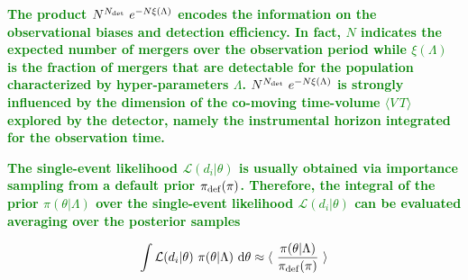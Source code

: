\documentclass[a4paper,titlepage]{book}     	%
\newcommand{\erika}[1]{\textcolor{green}{\bf#1}}
\begin{document}
\erika{The product $N^{N_{\rm det}}~e^{-N\xi(\Lambda)}$ encodes the information on the observational biases and detection efficiency. In fact, $N$ indicates the expected number of mergers over the observation period while $\xi(\Lambda)$ is the fraction of mergers that are detectable for the population characterized by hyper-parameters $\Lambda$. $N^{N_{\rm det}}~e^{-N\xi(\Lambda)}$ is strongly influenced by the dimension of the co-moving time-volume $\langle V\,T\rangle$ explored by the detector, namely the instrumental horizon integrated for the observation time.}

\erika{The single-event likelihood $\mathcal{L}(d_i|\theta)$ is usually obtained via importance sampling from a default prior $\pi_{\rm def}(\pi)$. Therefore, the integral of the prior $\pi(\theta|\Lambda)$ over the single-event likelihood $\mathcal{L}(d_i|\theta)$ can be evaluated averaging over the posterior samples}

\begin{equation}
   \int \mathcal{L}(d_i|\theta)~\pi(\theta|\Lambda)~\rm d\theta \approx \langle~ \frac{\pi(\theta|\Lambda)}{\pi_{\rm def}(\pi)}~\rangle
\end{equation}
\end{document}

